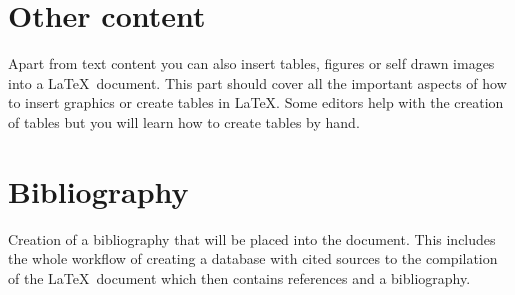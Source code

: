 \documentclass[10pt]{scrartcl}
\begin{document}
    \section{Other content}
    Apart from text content you can also insert tables, figures or self drawn images into a \LaTeX\ document. This part should cover all the important aspects of how to insert graphics or create tables in \LaTeX. Some editors help with the creation of tables but you will learn how to create tables by hand.

    \section{Bibliography}
    Creation of a bibliography that will be placed into the document. This includes the whole workflow of creating a database with cited sources to the compilation of the \LaTeX\ document which then contains references and a bibliography.
    
\end{document}
